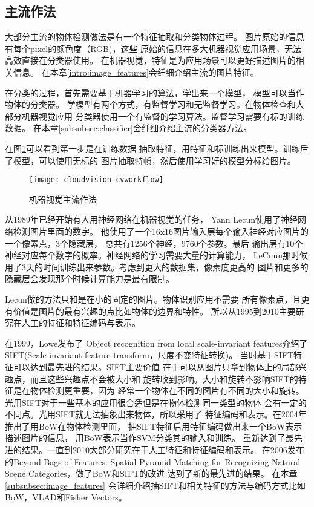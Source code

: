 \subsection{主流作法}
大部分主流的物体检测做法是有一个特征抽取和分类物体过程。\cite{juan2009comparison}
图片原始的信息有每个pixel的颜色度（RGB)，这些
原始的信息在多大机器视觉应用场景，无法高效直接在分类器使用。
在机器视觉，特征是为应用场景可以更好描述图片的相关信息。
在本章\ref{intro:image_features}会纤细介绍主流的图片特征。

在分类的过程，首先需要基于机器学习的算法，学出来一个模型，
模型可以当作物体的分类器。
学模型有两个方式，有监督学习和无监督学习。在物体检查和大部分机器视觉应用
分类器使用一个有监督的学习算法。监督学习需要有标的训练数据。
在本章\ref{subsubsec:classifier}会纤细介绍主流的分类器方法。

在图\ref{fig:cloudvision-cvworkflow}可以看到第一步是在训练数据
抽取特征，用特征和标训练出来模型。训练后了模型，可以使用无标的
图片抽取特幀，然后使用学习好的模型分标给图片。
\begin{figure}[H]
  \centering
    \texttt{[image: cloudvision-cvworkflow]}
  \caption{机器视觉主流作法}
  \label{fig:cloudvision-cvworkflow}
\end{figure}

从1989年已经开始有人用神经网络在机器视觉的任务，
Yann Lecun使用了神经网络检测图片里面的数字。\cite{lecun1989backpropagation}
他使用了一个16x16图片输入层每个输入神经对应图片的一个像素点，3个隐藏层，
总共有1256个神经，9760个参数。最后
输出层有10个神经对应每个数字的概率。神经网络的学习需要大量的计算能力，
LeCunn那时候用了3天的时间训练出来参数。考虑到更大的数据集，像素度更高的
图片和更多的隐藏层会发现那个时候计算能力是最有限制。

Lecun做的方法只和是在小的固定的图片。物体识别应用不需要
所有像素点，且更有价值是图片的最有兴趣的点比如物体的边界和特性。
所以从1995到2010主要研究在人工的特征和特征编码与表示。

在1999，Lowe发布了
Object recognition from local scale-invariant features介绍了
SIFT(Scale-invariant feature transform，尺度不变特征转换)。\cite{lowe1999object,lowe2004distinctive}
当时基于SIFT特征可以达到最先进的结果。SIFT主要价值
在于可以从图片只拿到物体上的局部兴趣点，而且这些兴趣点不会被大小和
旋转收到影响。大小和旋转不影响SIFT的特征是在物体检测更重要，因为
经常一个物体在不同的图片有不同的大小和旋转。
光用SIFT对于一些基本的应用很合适但是在物体检测同一类型的物体
会有一定的不同点。光用SIFT就无法抽象出来物体，所以采用了
特征编码和表示。在2004年推出了用BoW在物体检测里面，
抽SIFT特征后用特征编码做出来一个BoW表示描述图片的信息，
用BoW表示当作SVM分类其的输入和训练。\cite{csurka2004visual}
重新达到了最先进的结果。一直到2010大部分研究在于人工特征和特征编码和表示。
在2006发布的Beyond Bags of Features: Spatial Pyramid Matching
for Recognizing Natural Scene Categories，做了BoW和SIFT的改进
达到了新的最先进的结果。 \cite{lazebnik2006beyond}
在本章\ref{subsubsec:image_features}
会详细介绍抽SIFT和相关特征的方法与编码方式比如BoW，VLAD和Fisher Vectors。

